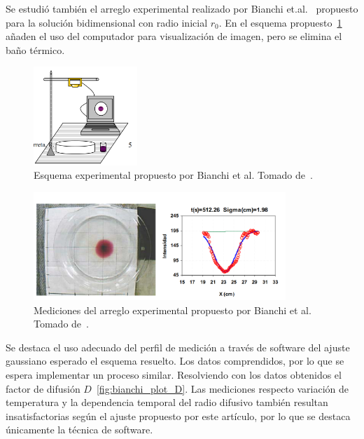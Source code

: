 \documentclass[11pt]{article}
\begin{document}
Se estudió también el arreglo experimental realizado por Bianchi et.al.~\cite{micaelaDifusionKMnO4Agua2006} propuesto para la solución bidimensional con radio inicial $r_0$. En el esquema propuesto~\ref{fig:esquema_bianchi} añaden el uso del computador para visualización de imagen, pero se elimina el baño térmico.
\begin{figure}[htp]
    \centering
    \includegraphics[width=0.35\textwidth]{figs/esquema_Bianchi.png}
    \caption{Esquema experimental propuesto por Bianchi et al. Tomado de~\cite{micaelaDifusionKMnO4Agua2006}.}
    \label{fig:esquema_bianchi}
\end{figure}
\begin{figure}[htp]
    \centering
    \includegraphics[width=0.85\textwidth]{figs/arrBianchi_fotos.png}
    \caption{Mediciones del arreglo experimental propuesto por Bianchi et al. Tomado de~\cite{micaelaDifusionKMnO4Agua2006}. }
    \label{fig:fotos_bianchi}
\end{figure}
Se destaca el uso adecuado del perfil de medición a través de software del ajuste gaussiano esperado el esquema resuelto. Los datos comprendidos, por lo que se espera implementar un proceso similar. Resolviendo con los datos obtenidos el factor de difusión $D$~\ref{fig:bianchi_plot_D}. Las mediciones respecto variación de temperatura y la dependencia temporal del radio difusivo también resultan insatisfactorias según el ajuste propuesto por este artículo, por lo que se destaca únicamente la técnica de software.
\end{document}
